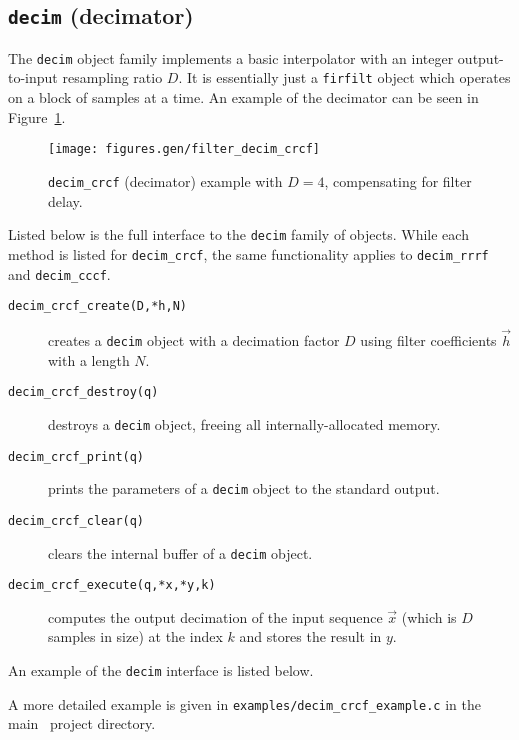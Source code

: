 % 
%
\subsection{{\tt decim} (decimator)}
\label{module:filter:decim}
The {\tt decim} object family implements a basic interpolator with an
integer output-to-input resampling ratio $D$.
It is essentially just a {\tt firfilt} object which operates on a block
of samples at a time.
An example of the decimator can be seen in
Figure~\ref{fig:module:filter:decim_crcf}.
%
\begin{figure}
\centering
  \texttt{[image: figures.gen/filter\_decim\_crcf]}
\caption{{\tt decim\_crcf} (decimator) example with $D=4$,
         compensating for filter delay.}
\label{fig:module:filter:decim_crcf}
\end{figure}
%
Listed below is the full interface to the {\tt decim} family of
objects.
While each method is listed for {\tt decim\_crcf}, the same
functionality applies to {\tt decim\_rrrf} and {\tt decim\_cccf}.
%
\begin{description}
\item[{\tt decim\_crcf\_create(D,*h,N)}]
    creates a {\tt decim} object with a decimation factor $D$ using
    filter coefficients $\vec{h}$ with a length $N$.
\item[{\tt decim\_crcf\_destroy(q)}]
    destroys a {\tt decim} object, freeing all internally-allocated
    memory.
\item[{\tt decim\_crcf\_print(q)}]
    prints the parameters of a {\tt decim} object to the standard
    output.
\item[{\tt decim\_crcf\_clear(q)}]
    clears the internal buffer of a {\tt decim} object.
\item[{\tt decim\_crcf\_execute(q,*x,*y,k)}]
    computes the output decimation of the input sequence $\vec{x}$
    (which is $D$ samples in size) at the index $k$ and stores the
    result in $y$.
\end{description}
%
An example of the {\tt decim} interface is listed below.
%

%
A more detailed example is given in
{\tt examples/decim\_crcf\_example.c}
in the main \liquid\ project directory.


%
%

